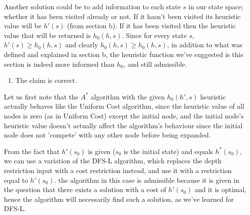 \documentclass[11pt]{article}
\providecommand{\tightlist}{%
      \setlength{\itemsep}{0pt}\setlength{\parskip}{0pt}}
\begin{document}
Another solution could be to add information to each state \(s\) in our
state space; whether it has been visited already or not. If it hasn't
been visited its heuristic value will be \(h'(s)\) (from section b). If
it has been visited then the heuristic value that will be returned is
\(h_0(h,s)\). Since for every state \(s\), \(h'(s)\geq h_0(h,s)\) and
clearly \(h_0(h,s)\geq h_0(h,s)\), in addition to what was defined and
explained in section b, the heuristic function we've suggested is this
section is indeed more informed than \(h_0\), and still admissible.

\begin{enumerate}
\def\labelenumi{\arabic{enumi}.}
\setcounter{enumi}{3}
\tightlist
\item
  The claim is correct.
\end{enumerate}

Let us first note that the \(A^*\) algorithm with the given
\(h_0(h',s)\) heuristic actually behaves like the Uniform Cost
algorithm, since the heuristic value of all nodes is zero (as in Uniform
Cost) except the initial node, and the initial node's heuristic value
doesn't actually affect the algorithm's behaviour since the initial node
does not 'compete' with any other node before being expanded.

From the fact that \(h'(s_0)\) is given (\(s_0\) is the initial state)
and equals \(h^*(s_0)\), we can use a variation of the DFS-L algorithm,
which replaces the depth restriction input with a cost restriction
instead, and use it with a restriction equal to \(h'(s_0)\). the
algorithm in this case is admissible because it is given in the question
that there exists a solution with a cost of \(h'(s_0)\) and it is
optimal, hence the algorithm will necessarily find such a solution, as
we've learned for DFS-L.

    


    
    
    
    
\end{document}
